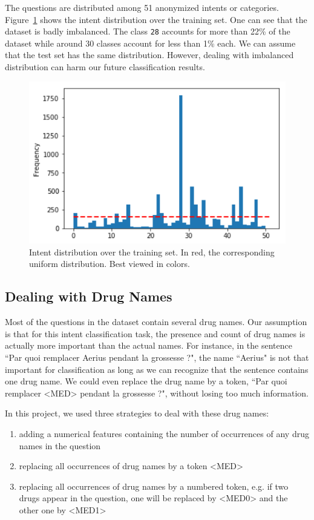 \documentclass[11pt,twocolumn,letterpaper]{article}
\begin{document}
The questions are distributed among 51 anonymized intents or categories. Figure~\ref{fig:intent_hist} shows the intent distribution over the training set. One can see that the dataset is badly imbalanced. The class \texttt{28} accounts for more than 22\% of the dataset while around 30 classes account for less than 1\% each. We can assume that the test set has the same distribution. However, dealing with imbalanced distribution can harm our future classification results.

\begin{figure}
\centering
\includegraphics[width=0.9\linewidth]{images/intent_hist}
\caption{Intent distribution over the training set. In red, the corresponding uniform distribution. Best viewed in colors.}
\label{fig:intent_hist}
\end{figure}

\subsection{Dealing with Drug Names}
\label{sec:drug-names}

Most of the questions in the dataset contain several drug names. Our assumption is that for this intent classification task, the presence and count of drug names is actually more important than the actual names. For instance, in the sentence ``Par quoi remplacer Aerius pendant la grossesse ?", the name ``Aerius" is not that important for classification as long as we can recognize that the sentence contains one drug name. We could even replace the drug name by a token, ``Par quoi remplacer <MED> pendant la grossesse ?", without losing too much information.

In this project, we used three strategies to deal with these drug names:
\begin{enumerate}
\item adding a numerical features containing the number of occurrences of any drug names in the question
\item replacing all occurrences of drug names by a token <MED>
\item replacing all occurrences of drug names by a numbered token, e.g. if two drugs appear in the question, one will be replaced by <MED0> and the other one by <MED1>
\end{enumerate}
\end{document}
